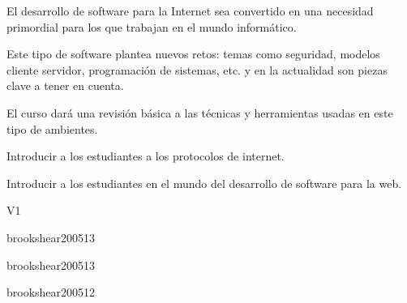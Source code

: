 \begin{syllabus}


\begin{justification}
El desarrollo de software para la Internet sea convertido en una necesidad primordial para los que trabajan en el mundo informático.

Este tipo de software plantea nuevos retos: temas como seguridad, modelos cliente servidor, programación de sistemas, etc. y en la actualidad son piezas clave a tener en cuenta.

El curso dará una revisión básica a las técnicas y herramientas usadas en este tipo de ambientes.
\end{justification}

\begin{goals}
\item Introducir a los estudiantes a los protocolos de internet.
\item Introducir a los estudiantes en el mundo del desarrollo de software para la web.
\end{goals}

\begin{outcomes}{V1}
   \item {}
   \item {}
   \item {}
   \item {}
   \item {}
\end{outcomes}

\begin{unit}{\NCIntroduction}{}{brookshear2005}{1}{3}
   \NCIntroductionAllTopics
   \NCIntroductionAllLearningOutcomes
\end{unit}

\begin{unit}{\NCNetworkedApplications}{}{brookshear2005}{1}{3}
   \NCNetworkedApplicationsAllTopics
   \NCNetworkedApplicationsAllLearningOutcomes
\end{unit}

\begin{unit}{\OSSecurityandProtection}{}{brookshear2005}{1}{2}
   \OSSecurityandProtectionAllTopics
   \OSSecurityandProtectionAllLearningOutcomes
\end{unit}


\end{syllabus}
